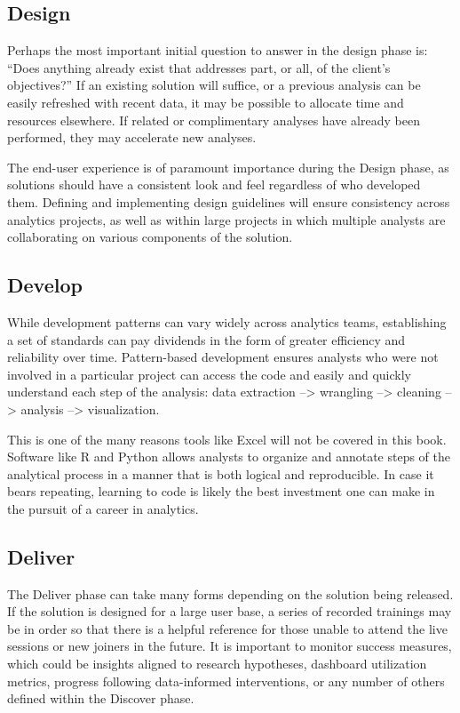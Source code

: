 \documentclass[]{book}
\begin{document}
\hypertarget{design}{%
\subsection{Design}\label{design}}

Perhaps the most important initial question to answer in the design phase is: ``Does anything already exist that addresses part, or all, of the client's objectives?'' If an existing solution will suffice, or a previous analysis can be easily refreshed with recent data, it may be possible to allocate time and resources elsewhere. If related or complimentary analyses have already been performed, they may accelerate new analyses.

The end-user experience is of paramount importance during the Design phase, as solutions should have a consistent look and feel regardless of who developed them. Defining and implementing design guidelines will ensure consistency across analytics projects, as well as within large projects in which multiple analysts are collaborating on various components of the solution.

\hypertarget{develop}{%
\subsection{Develop}\label{develop}}

While development patterns can vary widely across analytics teams, establishing a set of standards can pay dividends in the form of greater efficiency and reliability over time. Pattern-based development ensures analysts who were not involved in a particular project can access the code and easily and quickly understand each step of the analysis: data extraction --\textgreater{} wrangling --\textgreater{} cleaning --\textgreater{} analysis --\textgreater{} visualization.

This is one of the many reasons tools like Excel will not be covered in this book. Software like R and Python allows analysts to organize and annotate steps of the analytical process in a manner that is both logical and reproducible. In case it bears repeating, learning to code is likely the best investment one can make in the pursuit of a career in analytics.

\hypertarget{deliver}{%
\subsection{Deliver}\label{deliver}}

The Deliver phase can take many forms depending on the solution being released. If the solution is designed for a large user base, a series of recorded trainings may be in order so that there is a helpful reference for those unable to attend the live sessions or new joiners in the future. It is important to monitor success measures, which could be insights aligned to research hypotheses, dashboard utilization metrics, progress following data-informed interventions, or any number of others defined within the Discover phase.
\end{document}
